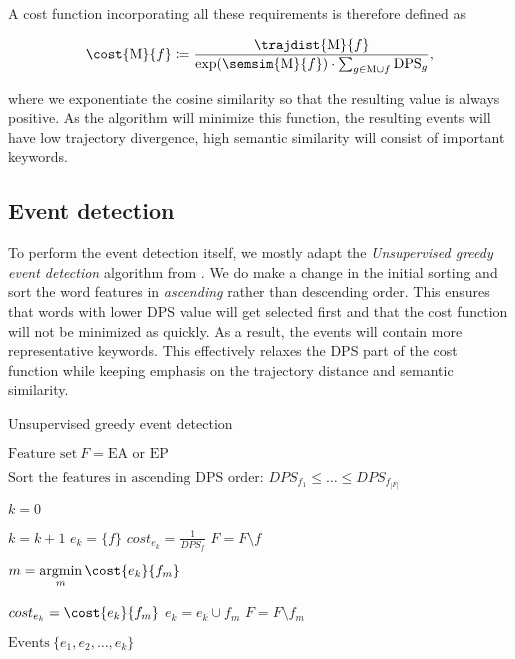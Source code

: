 A cost function incorporating all these requirements is therefore defined as

\begin{equation} \label{eq:cost-function}
	\cost{\featset}{f} \coloneqq \frac{\trajdist{\featset}{f}}{\exp(\semsim{\featset}{f}) \cdot \sum_{g \in \featset \cup f}{\text{DPS}_{g}}},
\end{equation}

where we exponentiate the cosine similarity so that the resulting value is always positive. As the algorithm will minimize this function, the resulting events will have low trajectory divergence, high semantic similarity will consist of important keywords.


\subsection{Event detection}
To perform the event detection itself, we mostly adapt the \textit{Unsupervised greedy event detection} algorithm from \cite{event-detection}. We do make a change in the initial sorting and sort the word features in \textit{ascending} rather than descending order. This ensures that words with lower DPS value will get selected first and that the cost function will not be minimized as quickly. As a result, the events will contain more representative keywords. This effectively relaxes the DPS part of the cost function while keeping emphasis on the trajectory distance and semantic similarity.

\begin{algorithm}[H] \label{alg:greedy-event-detection}
\begin{algorithmic}[1]
\caption{Unsupervised greedy event detection}
\Input $\text{Feature set} ~ F = \text{EA or EP}$

\State $\text{Sort the features in ascending DPS order: } DPS_{f_{1}} \leq \dots \leq DPS_{f_{\left\vert F \right\vert}}$

\State $k = 0$

	\State $k = k + 1$	
	\State $e_{k} = \{ f \}$
	\State $cost_{e_{k}} = \frac{1}{DPS_{f}}$
	\State $F = F \setminus f$
	
		\State $m = \argmin\limits_{m}{\cost{e_{k}}{f_{m}}}$

			\State $cost_{e_{k}} = \cost{e_{k}}{f_{m}}$
			\State $e_{k} = e_{k} \cup f_{m}$
			\State $F = F \setminus f_{m}$
		\Else
			\Break
		\EndIf
	\EndWhile
\EndFor

\Output $\text{Events} ~ \{ e_{1}, e_{2}, \dots, e_{k} \}$
\end{algorithmic}
\end{algorithm}


